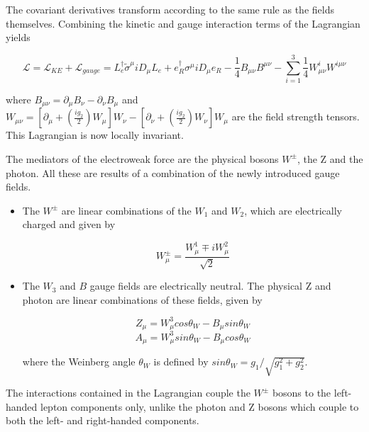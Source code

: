  The covariant derivatives transform according to the same rule as the fields themselves. Combining the kinetic and gauge interaction terms of the Lagrangian yields

 \begin{equation}
 \mathcal{L} = \mathcal{L}_{KE} + \mathcal{L}_{gauge}= L_{e}^{\dagger}\tilde{\sigma}^{\mu}iD_{\mu}L_{e}+e_{R}^{\dagger}\sigma^{\mu}iD_{\mu}e_{R} - \frac{1}{4}B_{\mu\nu}B^{\mu\nu}- \sum_{i=1}^{3}\frac{1}{4}W_{\mu\nu}^{i}W^{i\mu\nu}
 \end{equation}

 where $B_{\mu\nu}=\partial_{\mu}B_{\nu}-\partial_{\nu}B_{\mu}$ and $W_{\mu\nu} = [\partial_{\mu}+(\frac{ig_{2}}{2})W_{\mu}]W_{\nu} - [\partial_{\nu}+(\frac{ig_{2}}{2})W_{\nu}]W_{\mu}$ are the field strength tensors. This Lagrangian is now locally invariant.

 The mediators of the electroweak force are the physical bosons $W^{\pm}$, the Z and the photon. All these are results of a combination of the newly introduced gauge fields.

 \begin{itemize}

	 \item The $W^{\pm}$ are linear combinations of the $W_{1}$ and $W_{2}$, which are electrically charged and given by

	 \begin{equation}
		W_{\mu}^{\pm} = \frac{W_{\mu}^{1}\mp i W_{\mu}^{2}}{\sqrt{2}}
	\end{equation}

	\item The $W_{3}$ and $B$ gauge fields are electrically neutral. The physical Z and photon are linear combinations of these fields, given by

	\begin{equation}
	Z_{\mu} = W_{\mu}^{3}cos\theta_{W} - B_{\mu}sin\theta_{W}
	\end{equation}
	\begin{equation}
	A_{\mu} = W_{\mu}^{3}sin\theta_{W} - B_{\mu}cos\theta_{W}
	\end{equation}

	where the Weinberg angle $\theta_{W}$ is defined by $sin\theta_{W}= g_{1}/\sqrt{g_{1}^{2}+g_{2}^{2}}$.

\end{itemize}

The interactions contained in the Lagrangian couple the $W^{\pm}$ bosons to the left-handed lepton components only, unlike the photon and Z bosons which couple to both the left- and right-handed components. 

